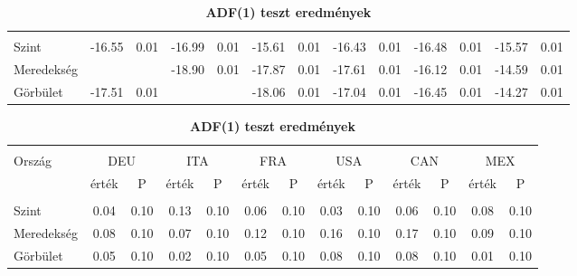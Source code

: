 \documentclass[12pt,bibliography=totoc]{article}
\begin{document}
\begin{table}
\begin{subtable}[t]{1\textwidth}
\begin{tabular}{l cc cc cc cc cc cc}
\hline       \\ [-1.5ex] 

Szint	&	-16.55	&	0.01	&	-16.99	&	0.01	&	-15.61	&	0.01	&	-16.43	&	0.01	&	-16.48	&	0.01	&	-15.57	&	0.01	\\
Meredekség	&		&		&	-18.90	&	0.01	&	-17.87	&	0.01	&	-17.61	&	0.01	&	-16.12	&	0.01	&	-14.59	&	0.01	\\
\medskip
Görbület	&	-17.51	&	0.01	&		&		&	-18.06	&	0.01	&	-17.04	&	0.01	&	-16.45	&	0.01	&	-14.27	&	0.01	\\



\hline
\end{tabular}
\caption{\textbf{ADF(1) teszt eredmények}}
\end{subtable}
\hspace{\fill}
\bigskip 

\begin{subtable}[t]{1\textwidth}
\centering
\begin{tabular}{l cc cc cc cc cc cc}%
\hline\hline \\ [-1.5ex]                         %

Ország	&	\multicolumn{2}{c}{DEU}			&	\multicolumn{2}{c}{ITA}			&	\multicolumn{2}{c}{FRA}			&	\multicolumn{2}{c}{USA}			&	\multicolumn{2}{c}{CAN}			&	\multicolumn{2}{c}{MEX}			\\[0.5ex] 

 & érték &P & érték &P& érték &P & érték &P& érték &P & érték &P\\

\hline       \\ [-1.5ex] 

Szint	&	0.04	&	0.10	&	0.13	&	0.10	&	0.06	&	0.10	&	0.03	&	0.10	&	0.06	&	0.10	&	0.08	&	0.10	\\
Meredekség	&	0.08	&	0.10	&	0.07	&	0.10	&	0.12	&	0.10	&	0.16	&	0.10	&	0.17	&	0.10	&	0.09	&	0.10	\\
Görbület	&	0.05	&	0.10	&	0.02	&	0.10	&0.05	&	0.10	&	0.08	&	0.10	&	0.08	&	0.10	&	0.01	&	0.10	\\



\end{tabular}
\end{subtable}
\end{table}
\end{document}
